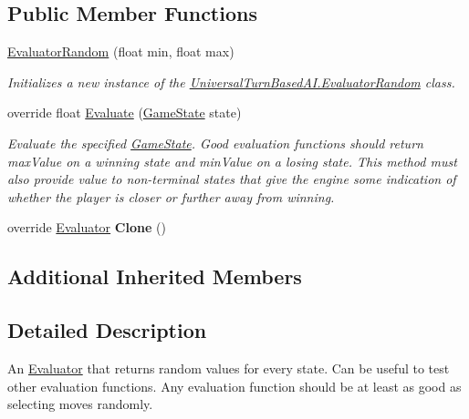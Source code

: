 \subsection*{Public Member Functions}
\begin{DoxyCompactItemize}
\item 
\hyperlink{class_universal_turn_based_a_i_1_1_evaluator_random_a3914def8b2e2bb2f6a264a6762b84063}{Evaluator\+Random} (float min, float max)
\begin{DoxyCompactList}\small\item\em Initializes a new instance of the \hyperlink{class_universal_turn_based_a_i_1_1_evaluator_random}{Universal\+Turn\+Based\+A\+I.\+Evaluator\+Random} class. \end{DoxyCompactList}\item 
override float \hyperlink{class_universal_turn_based_a_i_1_1_evaluator_random_ac7248adff1c997e43c63e4f34fc3121c}{Evaluate} (\hyperlink{class_universal_turn_based_a_i_1_1_game_state}{Game\+State} state)
\begin{DoxyCompactList}\small\item\em Evaluate the specified \hyperlink{class_universal_turn_based_a_i_1_1_game_state}{Game\+State}. Good evaluation functions should return max\+Value on a winning state and min\+Value on a losing state. This method must also provide value to non-\/terminal states that give the engine some indication of whether the player is closer or further away from winning. \end{DoxyCompactList}\item 
\hypertarget{class_universal_turn_based_a_i_1_1_evaluator_random_a15c6ccc02b7939167f538f82643139bd}{}override \hyperlink{class_universal_turn_based_a_i_1_1_evaluator}{Evaluator} {\bfseries Clone} ()\label{class_universal_turn_based_a_i_1_1_evaluator_random_a15c6ccc02b7939167f538f82643139bd}

\end{DoxyCompactItemize}
\subsection*{Additional Inherited Members}


\subsection{Detailed Description}
An \hyperlink{class_universal_turn_based_a_i_1_1_evaluator}{Evaluator} that returns random values for every state. Can be useful to test other evaluation functions. Any evaluation function should be at least as good as selecting moves randomly. 



